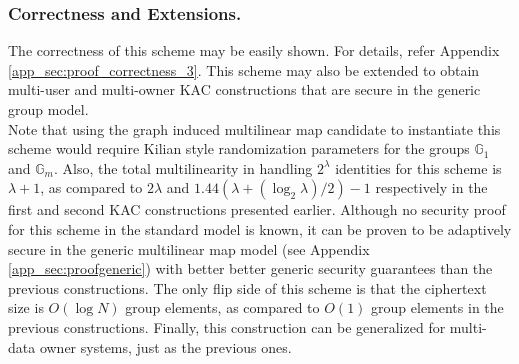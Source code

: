 \subsubsection{Correctness and Extensions.} The correctness of this scheme may be easily shown. For details, refer Appendix \ref{app_sec:proof_correctness_3}. This scheme may also be extended to obtain multi-user and multi-owner KAC constructions that are secure in the generic group model.\\

\noindent Note that using the graph induced multilinear map candidate to instantiate this scheme would require Kilian style randomization parameters for the groups $\mathbb{G}_1$ and $\mathbb{G}_m$. Also, the total multilinearity in handling $2^{\lambda}$ identities for this scheme is $\lambda+1$, as compared to $2\lambda$ and $1.44(\lambda+(\log_2\lambda)/2)-1$ respectively in the first and second KAC constructions presented earlier. Although no security proof for this scheme in the standard model is known, it can be proven to be adaptively secure in the generic multilinear map model (see Appendix \ref{app_sec:proofgeneric}) with better better generic security guarantees than the previous constructions. The only flip side of this scheme is that the ciphertext size is $O(\log N)$ group elements, as compared to $O(1)$ group elements in the previous constructions. Finally, this construction can be generalized for multi-data owner systems, just as the previous ones. 

% 
% 
% 
% 
% 
% 
% 
% 

  